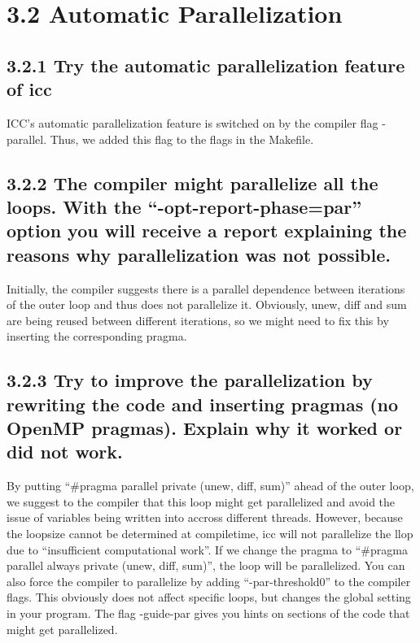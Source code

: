 \section*{3.2 Automatic Parallelization}
\label{3_2}


\subsection*{3.2.1 Try the automatic parallelization feature of icc}
ICC's automatic parallelization feature is switched on by the compiler flag -parallel. Thus, we added this flag to the flags in the Makefile.

\subsection*{3.2.2 The compiler might parallelize all the loops. With the ``-opt-report-phase=par'' option you will receive a report explaining the reasons why parallelization was not possible.}

Initially, the compiler suggests there is a parallel dependence between iterations of the outer loop and thus does not parallelize it. Obviously, unew, diff and sum are being reused between different iterations, so we might need to fix this by inserting the corresponding pragma.

\subsection*{3.2.3 Try to improve the parallelization by rewriting the code and inserting pragmas (no OpenMP pragmas). Explain why it worked or did not work.}
By putting ``\#pragma parallel private (unew, diff, sum)'' ahead of the outer loop, we suggest to the compiler that this loop might get parallelized and avoid the issue of variables being written into accross different threads. However, because the loopsize cannot be determined at compiletime, icc will not parallelize the llop due to ``insufficient computational work''. \newline If we change the pragma to ``\#pragma parallel always private (unew, diff, sum)'', the loop will be parallelized. You can also force the compiler to parallelize by adding ``-par-threshold0'' to the compiler flags. This obviously does not affect specific loops, but changes the global setting in your program. \newline The flag -guide-par gives you hints on sections of the code that might get parallelized.


